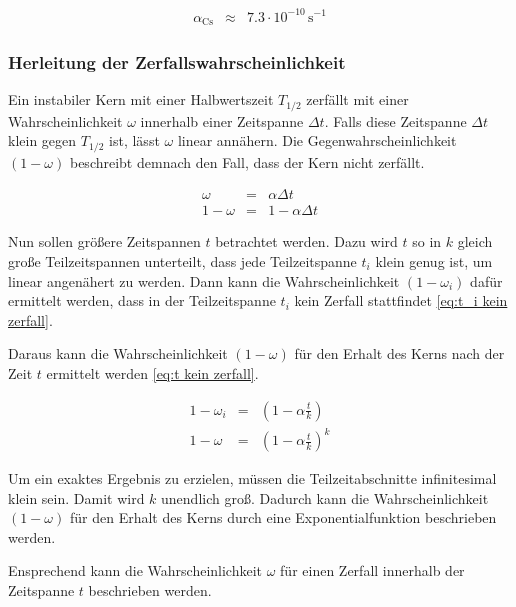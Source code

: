 \documentclass[12pt,a4paper]{scrartcl}
\numberwithin{equation}{section} %
\begin{document}
\begin{eqnarray}
	\alpha_\mathrm{Cs} &\approx& 7.3 \cdot 10^{-10} \mathrm{\,s^{-1}}
\end{eqnarray}

\hypertarget{Herleitung Zerfallswahrscheinlichkeit}{\subsubsection{Herleitung der Zerfallswahrscheinlichkeit}\label{Herleitung Zerfallswahrscheinlichkeit}}
Ein instabiler Kern mit einer Halbwertszeit $T_{1/2}$ zerfällt mit einer Wahrscheinlichkeit $\omega$ innerhalb einer Zeitspanne $\Delta t$. Falls diese Zeitspanne $\Delta t$ klein gegen $T_{1/2}$ ist, lässt $\omega$ linear annähern. Die Gegenwahrscheinlichkeit $(1-\omega)$ beschreibt demnach den Fall, dass der Kern nicht zerfällt.

\begin{eqnarray}
	\omega &=& \alpha \Delta t \label{eq:Zerfallswkt linear} \\
	1 - \omega &=& 1 - \alpha \Delta t
\end{eqnarray}

\noindent
Nun sollen größere Zeitspannen $t$ betrachtet werden. Dazu wird $t$ so in $k$ gleich große Teilzeitspannen unterteilt, dass jede Teilzeitspanne $t_i$ klein genug ist, um linear angenähert zu werden. Dann kann die Wahrscheinlichkeit $(1 - \omega_i)$ dafür ermittelt werden, dass in der Teilzeitspanne $t_i$ kein Zerfall stattfindet \eqref{eq:t_i kein zerfall}.

Daraus kann die Wahrscheinlichkeit $(1 - \omega)$ für den Erhalt des Kerns nach der Zeit $t$ ermittelt werden \eqref{eq:t kein zerfall}.

\begin{eqnarray}
	1 - \omega_i &=& \left(1 - \alpha \frac{t}{k}\right) \label{eq:t_i kein zerfall} \\
	1 - \omega &=& \left(1 - \alpha \frac{t}{k} \right)^k \label{eq:t kein zerfall}
\end{eqnarray}

\noindent
Um ein exaktes Ergebnis zu erzielen, müssen die Teilzeitabschnitte infinitesimal klein sein. Damit wird $k$ unendlich groß. Dadurch kann die Wahrscheinlichkeit $(1-\omega)$ für den Erhalt des Kerns durch eine Exponentialfunktion beschrieben werden.

Ensprechend kann die Wahrscheinlichkeit $\omega$ für einen Zerfall innerhalb der Zeitspanne $t$ beschrieben werden.
\end{document}
